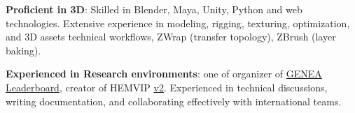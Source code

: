 \begin{onecolentry}
\begin{highlightsforbulletentries}
			
			\item \textbf{Proficient in 3D}: Skilled in Blender, Maya, Unity, Python and web technologies. Extensive experience in modeling, rigging, texturing, optimization, and 3D assets technical workflows, ZWrap (transfer topology), ZBrush (layer baking).
			
			
			\item \textbf{Experienced in Research environments}: one of organizer of
			\href{https://bit.ly/GENEALeaderboard}{GENEA Leaderboard}, creator of HEMVIP \href{https://github.com/hemvip/hemvip.github.io}{v2}.  Experienced in technical discussions, writing documentation, and collaborating effectively with international teams.
			
			

			
			
		
			

		\end{highlightsforbulletentries}
	\end{onecolentry}
	
	
	
	
	